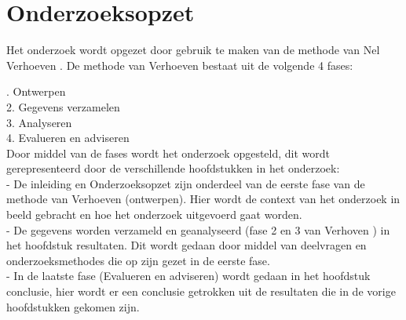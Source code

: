 \section{Onderzoeksopzet}
Het onderzoek wordt opgezet door gebruik te maken van de  methode van Nel Verhoeven \Parencite{Verhoeven}.
De methode van Verhoeven bestaat uit de volgende 4 fases:

. Ontwerpen \\
2. Gegevens verzamelen \\
3. Analyseren \\
4. Evalueren en adviseren \\

\whitespace[2]
Door middel van de fases wordt het onderzoek opgesteld, dit wordt gerepresenteerd door de verschillende hoofdstukken in het onderzoek: \\
- De inleiding en Onderzoeksopzet zijn onderdeel van de eerste fase van de methode van Verhoeven (ontwerpen).
Hier wordt de context van het onderzoek in beeld gebracht en hoe het onderzoek uitgevoerd gaat worden. \\ 
- De gegevens worden verzameld en geanalyseerd (fase 2 en 3 van Verhoven \Parencite{Verhoeven}) in het hoofdstuk resultaten.
Dit wordt gedaan door middel van deelvragen en onderzoeksmethodes die op zijn gezet in de eerste fase.\\ 
- In de laatste fase (Evalueren en adviseren) wordt gedaan in het hoofdstuk conclusie, hier wordt er een conclusie getrokken uit de resultaten die in de vorige hoofdstukken gekomen zijn.
